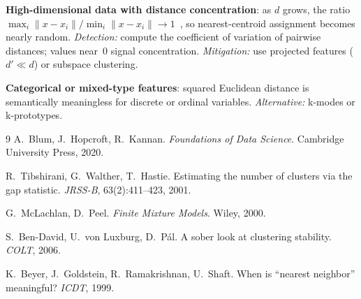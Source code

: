\documentclass[10pt,a4paper]{article}
\begin{document}
\textbf{High-dimensional data with distance concentration}: as $d$ grows, the
ratio $\max_i\|x-x_i\| / \min_i\|x-x_i\|\to 1$~\cite{beyer1999nearest}, so
nearest-centroid assignment becomes nearly random.
\emph{Detection:} compute the coefficient of variation of pairwise distances;
values near~0 signal concentration.  \emph{Mitigation:} use projected features
($d'\ll d$) or subspace clustering.

\textbf{Categorical or mixed-type features}: squared Euclidean distance is
semantically meaningless for discrete or ordinal variables.
\emph{Alternative:} k-modes or k-prototypes.


\begin{thebibliography}{9}
A.~Blum, J.~Hopcroft, R.~Kannan.
\textit{Foundations of Data Science}.
Cambridge University Press, 2020.

R.~Tibshirani, G.~Walther, T.~Hastie.
Estimating the number of clusters via the gap statistic.
\textit{JRSS-B}, 63(2):411--423, 2001.

G.~McLachlan, D.~Peel.
\textit{Finite Mixture Models}.
Wiley, 2000.

S.~Ben-David, U.~von Luxburg, D.~P{\'a}l.
A sober look at clustering stability.
\textit{COLT}, 2006.

K.~Beyer, J.~Goldstein, R.~Ramakrishnan, U.~Shaft.
When is ``nearest neighbor'' meaningful?
\textit{ICDT}, 1999.
\end{thebibliography}
\end{document}
